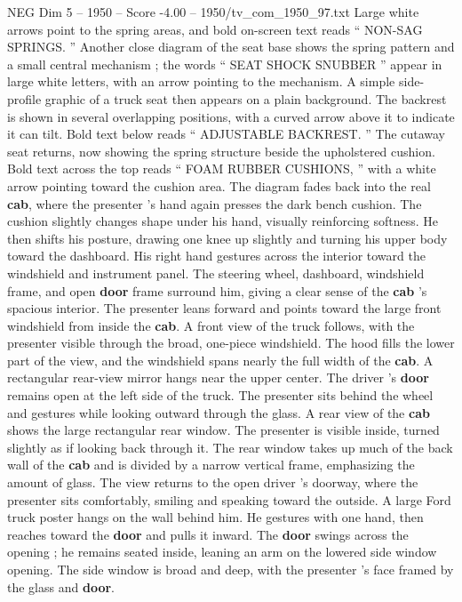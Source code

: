 \begin{textsample}{NEG Dim 5 – 1950 – Score -4.00 – 1950/tv\_com\_1950\_97.txt}
Large white arrows point to the spring areas, and bold on-screen text reads “ NON-SAG SPRINGS. ” Another close diagram of the seat base shows the spring pattern and a small central mechanism ; the words “ SEAT SHOCK SNUBBER ” appear in large white letters, with an arrow pointing to the mechanism.
A simple side-profile graphic of a truck seat then appears on a plain background.
The backrest is shown in several overlapping positions, with a curved arrow above it to indicate it can tilt.
Bold text below reads “ ADJUSTABLE BACKREST. ” The cutaway seat returns, now showing the spring structure beside the upholstered cushion.
Bold text across the top reads “ FOAM RUBBER CUSHIONS, ” with a white arrow pointing toward the cushion area.
The diagram fades back into the real \textbf{cab}, where the presenter ’s hand again presses the dark bench cushion.
The cushion slightly changes shape under his hand, visually reinforcing softness.
He then shifts his posture, drawing one knee up slightly and turning his upper body toward the dashboard.
His right hand gestures across the interior toward the windshield and instrument panel.
The steering wheel, dashboard, windshield frame, and open \textbf{door} frame surround him, giving a clear sense of the \textbf{cab} ’s spacious interior.
The presenter leans forward and points toward the large front windshield from inside the \textbf{cab}.
A front view of the truck follows, with the presenter visible through the broad, one-piece windshield.
The hood fills the lower part of the view, and the windshield spans nearly the full width of the \textbf{cab}.
A rectangular rear-view mirror hangs near the upper center.
The driver ’s \textbf{door} remains open at the left side of the truck.
The presenter sits behind the wheel and gestures while looking outward through the glass.
A rear view of the \textbf{cab} shows the large rectangular rear window.
The presenter is visible inside, turned slightly as if looking back through it.
The rear window takes up much of the back wall of the \textbf{cab} and is divided by a narrow vertical frame, emphasizing the amount of glass.
The view returns to the open driver ’s doorway, where the presenter sits comfortably, smiling and speaking toward the outside.
A large Ford truck poster hangs on the wall behind him.
He gestures with one hand, then reaches toward the \textbf{door} and pulls it inward.
The \textbf{door} swings across the opening ; he remains seated inside, leaning an arm on the lowered side window opening.
The side window is broad and deep, with the presenter ’s face framed by the glass and \textbf{door}.

\end{textsample}
